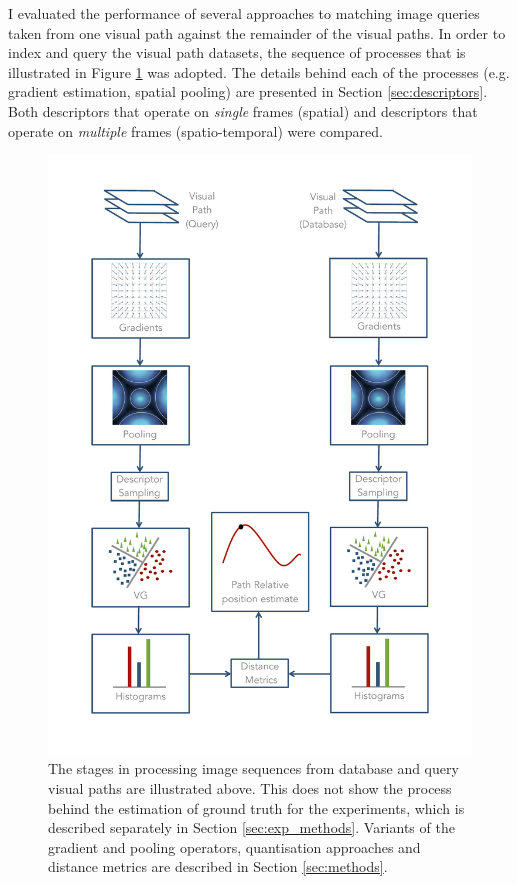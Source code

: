 I evaluated the performance of several approaches to matching image queries taken from one visual path against the remainder of the visual paths.  In order to index and query the visual path datasets, the sequence of processes that is illustrated in Figure \ref{fig:FigPipeline} was adopted. The details behind each of the processes (e.g. gradient estimation, spatial pooling) are presented in Section \ref{sec:descriptors}.  Both descriptors that operate on \textit{single} frames (spatial) and descriptors that operate on \textit{multiple} frames (spatio-temporal) were compared.

\begin{figure}
\begin{center}
\includegraphics[width=\textwidth]{./gfx/Chapter04/pipeline.pdf}
\caption{The stages in processing image sequences from database and query visual paths are illustrated above.  This does not show the process behind the estimation of ground truth for the experiments, which is described separately in Section \ref{sec:exp_methods}.  Variants of the gradient and pooling operators, quantisation approaches and distance metrics are described in Section \ref{sec:methods}.}
\label{fig:FigPipeline}
\end{center}
\end{figure}

